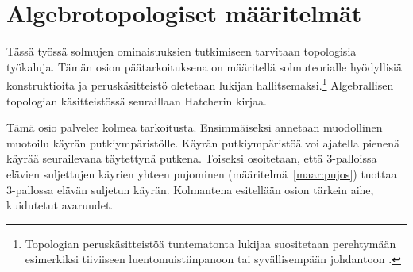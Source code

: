 \section{Algebrotopologiset määritelmät}

Tässä työssä solmujen ominaisuuksien tutkimiseen tarvitaan topologisia työkaluja. Tämän osion päätarkoituksena on määritellä solmuteorialle hyödyllisiä konstruktioita ja peruskäsitteistö oletetaan lukijan hallitsemaksi.\footnote{Topologian peruskäsitteistöä tuntematonta lukijaa suositetaan perehtymään esimerkiksi tiiviiseen luentomuistiinpanoon \citep{koski2024topology} tai syvällisempään johdantoon \citep{Munkres2000}.} Algebrallisen topologian käsitteistössä seuraillaan Hatcherin \citep{Hatcher2002} kirjaa.

Tämä osio palvelee kolmea tarkoitusta. Ensimmäiseksi annetaan muodollinen muotoilu käyrän putkiympäristölle. Käyrän putkiympäristöä voi ajatella pienenä käyrää seurailevana täytettynä putkena. Toiseksi osoitetaan, että $3$-palloissa elävien suljettujen käyrien yhteen pujominen (määritelmä~\ref{maar:pujos}) tuottaa 3-pallossa elävän suljetun käyrän. Kolmantena esitellään osion tärkein aihe, kuidutetut avaruudet.


